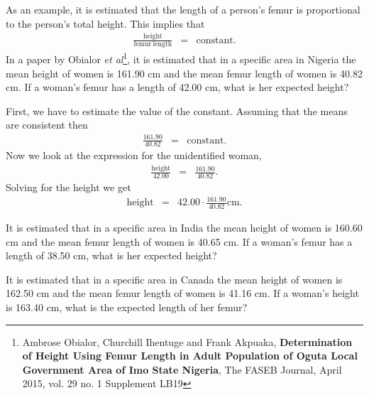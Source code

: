 \begin{problem}
  As an example, it is estimated that the length of a person's femur
  is proportional to the person's total height. This implies that
  \begin{eqnarray*}
    \frac{\mathrm{height}}{\mathrm{femur ~ length}} & = & \mathrm{constant}.
  \end{eqnarray*}
  In a paper by Obialor \textit{et al}\footnote{Ambrose Obialor,
    Churchill Ihentuge and Frank Akpuaka, \textbf{Determination of
      Height Using Femur Length in Adult Population of Oguta Local
      Government Area of Imo State Nigeria}, The FASEB Journal, April
    2015, vol. 29 no. 1 Supplement LB19}, it is estimated that in a
  specific area in Nigeria the mean height of women is 161.90 cm and
  the mean femur length of women is 40.82 cm. If a woman's femur has a
  length of 42.00 cm, what is her expected height?

  First, we have to estimate the value of the constant. Assuming that
  the means are consistent then 
  \begin{eqnarray*}
    \frac{161.90}{40.82} & = & \mathrm{constant.}
  \end{eqnarray*}
  Now we look at the expression for the unidentified woman,
  \begin{eqnarray*}
    \frac{\mathrm{height}}{42.00} & = & \frac{161.90}{40.82}.
  \end{eqnarray*}
  Solving for the height we get
  \begin{eqnarray*}
    \mathrm{height} & = & 42.00\cdot\frac{161.90}{40.82} \mathrm{cm}.
  \end{eqnarray*}
  \begin{subproblem}
  \item It is estimated that in a specific area in India the mean
    height of women is 160.60 cm and the mean femur length of women is
    40.65 cm. If a woman's femur has a length of 38.50 cm, what is her
    expected height?
  \item It is estimated that in a specific area in Canada the mean
    height of women is 162.50 cm and the mean femur length of women is
    41.16 cm. If a woman's height is 163.40 cm, what is the expected
    length of her femur?
  \end{subproblem}

\end{problem}
